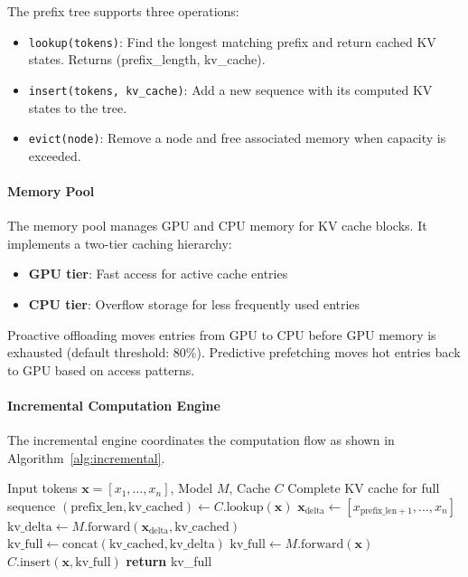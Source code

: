 \documentclass{article}
\begin{document}
The prefix tree supports three operations:
\begin{itemize}
    \item \texttt{lookup(tokens)}: Find the longest matching prefix and return cached KV states. Returns (prefix\_length, kv\_cache).
    \item \texttt{insert(tokens, kv\_cache)}: Add a new sequence with its computed KV states to the tree.
    \item \texttt{evict(node)}: Remove a node and free associated memory when capacity is exceeded.
\end{itemize}

\paragraph{Memory Pool}
The memory pool manages GPU and CPU memory for KV cache blocks.
It implements a two-tier caching hierarchy:
\begin{itemize}
    \item \textbf{GPU tier}: Fast access for active cache entries
    \item \textbf{CPU tier}: Overflow storage for less frequently used entries
\end{itemize}
Proactive offloading moves entries from GPU to CPU before GPU memory is exhausted (default threshold: 80\%).
Predictive prefetching moves hot entries back to GPU based on access patterns.

\paragraph{Incremental Computation Engine}
The incremental engine coordinates the computation flow as shown in Algorithm~\ref{alg:incremental}.

\begin{algorithm}[t]
\caption{Incremental KV Computation}
\label{alg:incremental}
\begin{algorithmic}[1]
\REQUIRE Input tokens $\mathbf{x} = [x_1, \ldots, x_n]$, Model $M$, Cache $C$
\ENSURE Complete KV cache for full sequence
\STATE $(\text{prefix\_len}, \text{kv\_cached}) \leftarrow C.\text{lookup}(\mathbf{x})$
    \STATE $\mathbf{x}_\text{delta} \leftarrow [x_{\text{prefix\_len}+1}, \ldots, x_n]$
    \STATE $\text{kv\_delta} \leftarrow M.\text{forward}(\mathbf{x}_\text{delta}, \text{kv\_cached})$
    \STATE $\text{kv\_full} \leftarrow \text{concat}(\text{kv\_cached}, \text{kv\_delta})$
\ELSE
    \STATE $\text{kv\_full} \leftarrow M.\text{forward}(\mathbf{x})$
\ENDIF
\STATE $C.\text{insert}(\mathbf{x}, \text{kv\_full})$
\STATE \textbf{return} kv\_full
\end{algorithmic}
\end{algorithm}
\end{document}
